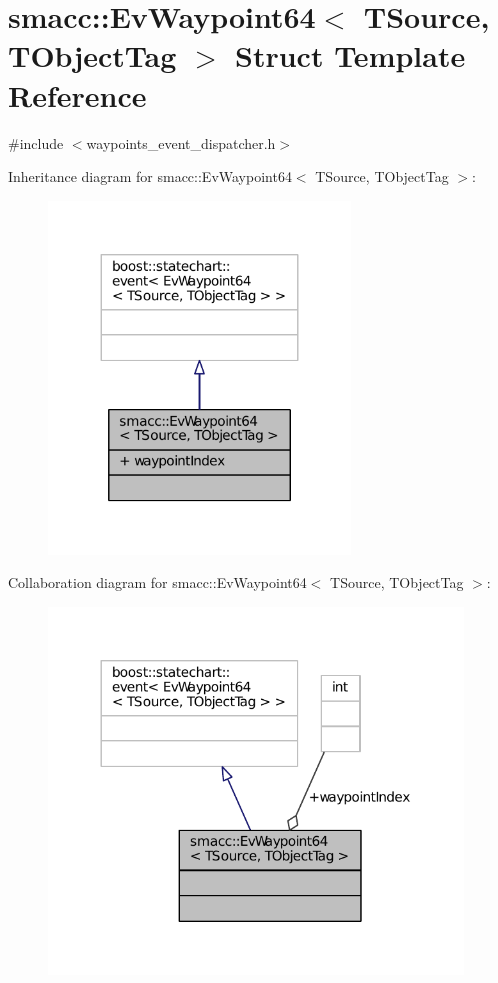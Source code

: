 \hypertarget{structsmacc_1_1EvWaypoint64}{}\section{smacc\+:\+:Ev\+Waypoint64$<$ T\+Source, T\+Object\+Tag $>$ Struct Template Reference}
\label{structsmacc_1_1EvWaypoint64}


{\ttfamily \#include $<$waypoints\+\_\+event\+\_\+dispatcher.\+h$>$}



Inheritance diagram for smacc\+:\+:Ev\+Waypoint64$<$ T\+Source, T\+Object\+Tag $>$\+:
\nopagebreak
\begin{figure}[H]
\begin{center}
\leavevmode
\includegraphics[width=227pt]{structsmacc_1_1EvWaypoint64__inherit__graph}
\end{center}
\end{figure}


Collaboration diagram for smacc\+:\+:Ev\+Waypoint64$<$ T\+Source, T\+Object\+Tag $>$\+:
\nopagebreak
\begin{figure}[H]
\begin{center}
\leavevmode
\includegraphics[width=312pt]{structsmacc_1_1EvWaypoint64__coll__graph}
\end{center}
\end{figure}
